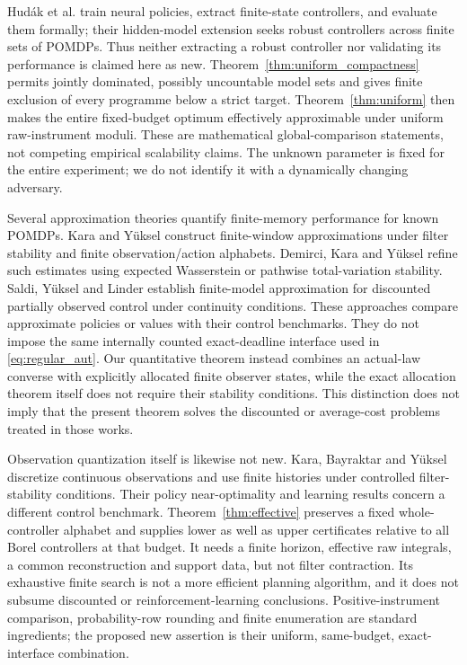 Hud\'ak et al.\cite{hiddenmodel} train neural policies, extract finite-state controllers, and evaluate them formally; their hidden-model extension seeks robust controllers across finite sets of POMDPs. Thus neither extracting a robust controller nor validating its performance is claimed here as new. Theorem~\ref{thm:uniform_compactness} permits jointly dominated, possibly uncountable model sets and gives finite exclusion of every programme below a strict target. Theorem~\ref{thm:uniform} then makes the entire fixed-budget optimum effectively approximable under uniform raw-instrument moduli. These are mathematical global-comparison statements, not competing empirical scalability claims. The unknown parameter is fixed for the entire experiment; we do not identify it with a dynamically changing adversary.

Several approximation theories quantify finite-memory performance for known POMDPs. Kara and Y\"uksel\cite{kara} construct finite-window approximations under filter stability and finite observation/action alphabets. Demirci, Kara and Y\"uksel\cite{refined} refine such estimates using expected Wasserstein or pathwise total-variation stability. Saldi, Y\"uksel and Linder\cite{saldi} establish finite-model approximation for discounted partially observed control under continuity conditions. These approaches compare approximate policies or values with their control benchmarks. They do not impose the same internally counted exact-deadline interface used in \eqref{eq:regular_aut}. Our quantitative theorem instead combines an actual-law converse with explicitly allocated finite observer states, while the exact allocation theorem itself does not require their stability conditions. This distinction does not imply that the present theorem solves the discounted or average-cost problems treated in those works.

Observation quantization itself is likewise not new. Kara, Bayraktar and Y\"uksel\cite{continuous} discretize continuous observations and use finite histories under controlled filter-stability conditions. Their policy near-optimality and learning results concern a different control benchmark. Theorem~\ref{thm:effective} preserves a fixed whole-controller alphabet and supplies lower as well as upper certificates relative to all Borel controllers at that budget. It needs a finite horizon, effective raw integrals, a common reconstruction and support data, but not filter contraction. Its exhaustive finite search is not a more efficient planning algorithm, and it does not subsume discounted or reinforcement-learning conclusions. Positive-instrument comparison, probability-row rounding and finite enumeration are standard ingredients; the proposed new assertion is their uniform, same-budget, exact-interface combination.

